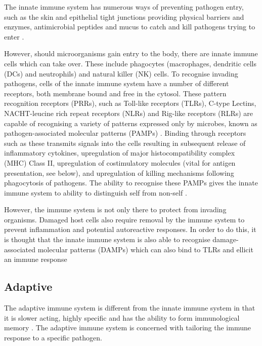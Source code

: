 The innate immune system has numerous ways of preventing pathogen entry, such as the skin and epithelial tight junctions providing physical barriers and enzymes, antimicrobial peptides and mucus to catch and kill pathogens trying to enter \citep{Janeway2001, Parkin2001}.

However, should microorganisms gain entry to the body, there are innate immune cells which can take over.
These include phagocytes (macrophages, dendritic cells (DCs) and neutrophils) and natural killer (NK) cells. 
To recognise invading pathogens, cells of the innate immune system have a number of different receptors, both membrane bound and free in the cytosol.
These pattern recognition receptors (PRRs), such as Toll-like receptors (TLRs), C-type Lectins, NACHT-leucine rich repeat receptors (NLRs) and Rig-like receptors (RLRs) are capable of recognising a variety of patterns expressed only by microbes, known as pathogen-associated molecular patterns (PAMPs) \citep{Medzhitov2000, Iwasaki2004}.
Binding through receptors such as these transmits signals into the cells resulting in subsequent release of inflammatory cytokines, upregulation of major histocompatibility complex (MHC) Class II, upregulation of costimulatory molecules (vital for antigen presentation, see below), and upregulation of killing mechanisms following phagocytosis of pathogens.
The ability to recognise these PAMPs gives the innate immune system to ability to distinguish self from non-self \citep{Medzhitov2000}.

However, the immune system is not only there to protect from invading organisms. 
Damaged host cells also require removal by the immune system  to prevent inflammation and potential autoreactive responses. 
In order to do this, it is thought that the innate immune system is also able to recognise damage-associated molecular patterns (DAMPs) which can also bind to TLRs and ellicit an immune response \citep{Matzinger1994, Shin2015}


\subsection{Adaptive}

The adaptive immune system is different from the innate immune system in that it is slower acting, highly specific and has the ability to form immunological memory \citep{Parkin2001}.
The adaptive immune system is concerned with tailoring the immune response to a specific pathogen.

